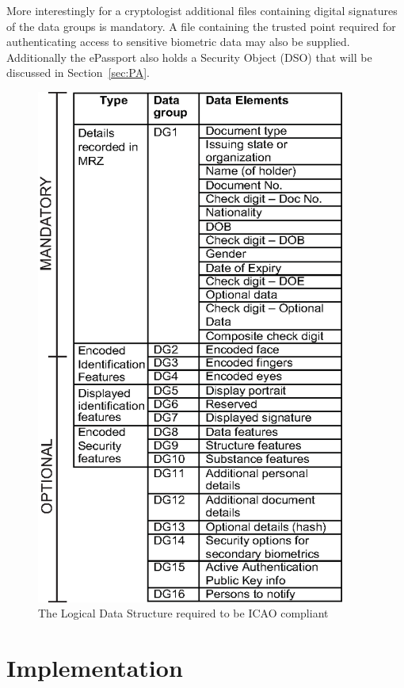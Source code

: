 \documentclass[12pt]{article}
\begin{document}
More interestingly for a cryptologist additional files containing digital signatures of the data groups is mandatory. A file containing the trusted point required for authenticating access to sensitive biometric data may also be supplied. Additionally the ePassport also holds a Security Object (DSO) that will be discussed in Section~\ref{sec:PA}.

\begin{figure}
\centering
\includegraphics[width=4in]{LDS.eps}
\caption{The Logical Data Structure required to be ICAO compliant \cite{Anonymous:2006vu}}
\label{fig:LDS}
\end{figure}

\section{Implementation}
{\color{red}{This section could cover practical issues related to the implementation of an algorithm, protocol, or system, and may link to demonstration software that has been developed as part of the project.}}
\end{document}
